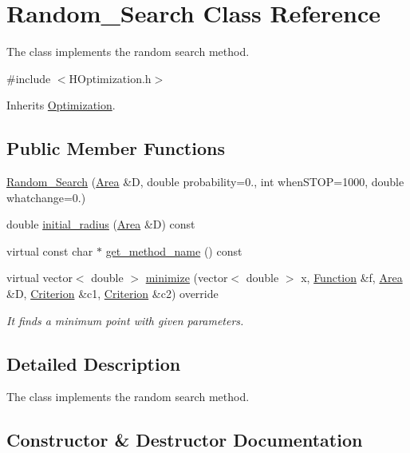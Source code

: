 \hypertarget{class_random___search}{}\section{Random\+\_\+\+Search Class Reference}
\label{class_random___search}


The class implements the random search method.  




{\ttfamily \#include $<$H\+Optimization.\+h$>$}



Inherits \hyperlink{class_optimization}{Optimization}.

\subsection*{Public Member Functions}
\begin{DoxyCompactItemize}
\item 
\hyperlink{class_random___search_ac7ba7f72e3d13ae8354617ba04aaae11}{Random\+\_\+\+Search} (\hyperlink{class_area}{Area} \&D, double probability=0., int when\+S\+T\+OP=1000, double whatchange=0.)
\item 
double \hyperlink{class_random___search_a4f55089354c6d2e27bef8e96a0f18f80}{initial\+\_\+radius} (\hyperlink{class_area}{Area} \&D) const
\item 
virtual const char $\ast$ \hyperlink{class_random___search_a4ba44714765f2835a63765d8ac62dc35}{get\+\_\+method\+\_\+name} () const
\item 
virtual vector$<$ double $>$ \hyperlink{class_random___search_a14fb417ae9e7f3597e5590de599e3846}{minimize} (vector$<$ double $>$ x, \hyperlink{class_function}{Function} \&f, \hyperlink{class_area}{Area} \&D, \hyperlink{class_criterion}{Criterion} \&c1, \hyperlink{class_criterion}{Criterion} \&c2) override
\begin{DoxyCompactList}\small\item\em It finds a minimum point with given parameters. \end{DoxyCompactList}\end{DoxyCompactItemize}


\subsection{Detailed Description}
The class implements the random search method. 

\subsection{Constructor \& Destructor Documentation}
\mbox{\label{class_random___search_ac7ba7f72e3d13ae8354617ba04aaae11}} 

